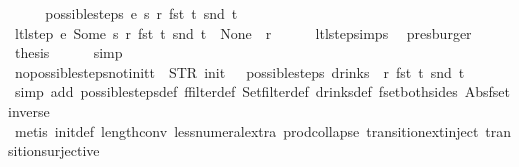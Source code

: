 \begin{isabellebody}
%
\isadelimproof
%
\endisadelimproof
%
\isatagproof
{}\isamarkupfalse%
\ {\isacharminus}\isanewline
\ \ \isamarkupfalse%
\ {\isachardoublequoteopen}possible{\isacharunderscore}steps\ e\ s\ r\ {\isacharparenleft}fst\ t{\isacharparenright}\ {\isacharparenleft}snd\ t{\isacharparenright}\ {\isacharequal}\ {\isacharbraceleft}{\isacharbar}{\isacharbar}{\isacharbraceright}{\isachardoublequoteclose}\isanewline
\ \ \isamarkupfalse%
\ \isamarkupfalse%
\ {\isachardoublequoteopen}ltl{\isacharunderscore}step\ e\ {\isacharparenleft}Some\ s{\isacharparenright}\ r\ {\isacharparenleft}fst\ t{\isacharcomma}\ snd\ t{\isacharparenright}\ {\isacharequal}\ {\isacharparenleft}None{\isacharcomma}\ {\isacharbrackleft}{\isacharbrackright}{\isacharcomma}\ r{\isacharparenright}{\isachardoublequoteclose}\isanewline
\ \ \ \ \isamarkupfalse%
\ ltl{\isacharunderscore}step{\isachardot}simps{\isacharparenleft}{}{\isacharparenright}\ \isamarkupfalse%
\ presburger\isanewline
\ \ \isamarkupfalse%
\ \isamarkupfalse%
\ {\isacharquery}thesis\isanewline
\ \ \ \ \isamarkupfalse%
\ simp\isanewline
{}\isamarkupfalse%
%
\endisatagproof
{\isafoldproof}%
%
\isadelimproof
\isanewline
%
\endisadelimproof
\isanewline
{}\isamarkupfalse%
\ no{\isacharunderscore}possible{\isacharunderscore}steps{\isacharunderscore}not{\isacharunderscore}init{\isacharcolon}{\isachardoublequoteopen}t\ {\isasymnoteq}\ {\isacharparenleft}STR\ {\isacharprime}{\isacharprime}init{\isacharprime}{\isacharprime}{\isacharcomma}\ {\isacharbrackleft}{\isacharbrackright}{\isacharparenright}\ {\isasymLongrightarrow}\ possible{\isacharunderscore}steps\ drinks\ {}\ r\ {\isacharparenleft}fst\ t{\isacharparenright}\ {\isacharparenleft}snd\ t{\isacharparenright}\ {\isacharequal}\ {\isacharbraceleft}{\isacharbar}{\isacharbar}{\isacharbraceright}{\isachardoublequoteclose}\isanewline
%
\isadelimproof
\ \ %
\endisadelimproof
%
\isatagproof
{}\isamarkupfalse%
\ {\isacharparenleft}simp\ add{\isacharcolon}\ possible{\isacharunderscore}steps{\isacharunderscore}def\ ffilter{\isacharunderscore}def\ Set{\isachardot}filter{\isacharunderscore}def\ drinks{\isacharunderscore}def\ fset{\isacharunderscore}both{\isacharunderscore}sides\ Abs{\isacharunderscore}fset{\isacharunderscore}inverse{\isacharparenright}\isanewline
\ \ \isamarkupfalse%
\ {\isacharparenleft}metis\ init{\isacharunderscore}def\ length{\isacharunderscore}{}{\isacharunderscore}conv\ less{\isacharunderscore}numeral{\isacharunderscore}extra{\isacharparenleft}{}{\isacharparenright}\ prod{\isachardot}collapse\ transition{\isachardot}ext{\isacharunderscore}inject\ transition{\isachardot}surjective{\isacharparenright}%

\end{isabellebody}
